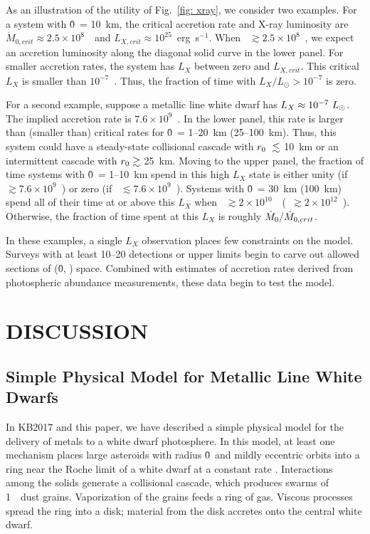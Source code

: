 \documentclass[12pt,preprint]{aastex}
\begin{document}
As an illustration of the utility of Fig.~\ref{fig: xray}, we consider two examples.
For a system with \r0\ = 10~km, the critical accretion rate and X-ray luminosity are 
$\dot{M}_{0, crit} \approx 2.5 \times 10^{8}$~\gs\ and 
$L_{X, crit} \approx 10^{25}$~erg~s$^{-1}$. When 
\mdotz\ $\gtrsim 2.5 \times 10^{8}$~\gs, we expect an accretion luminosity along the
diagonal solid curve in the lower panel. For smaller accretion rates, the system has
$L_X$ between zero and $L_{X, crit}$. This critical $L_X$ is smaller than $10^{-7}$~\lsun.
Thus, the fraction of time with $L_X / L_\odot > 10^{-7}$ is zero.

For a second example, suppose a metallic line white dwarf has $L_X \approx 10^{-7}~\lsun$.  
The implied accretion rate is $7.6 \times 10^9$~\gs.  In the lower panel, this rate is 
larger than (smaller than) critical rates for \r0\ = 1--20~km (25--100~km). Thus, this 
system could have a steady-state collisional cascade with $\r0\ \lesssim$ 10~km or an 
intermittent cascade with $\r0 \gtrsim$ 25~km. Moving to the upper panel, the fraction of
time systems with \r0\ = 1--10~km spend in this high $L_X$ state is either unity (if
\mdotz\ $\gtrsim 7.6 \times 10^9$~\gs) or zero (if \mdotz\ $\lesssim 7.6 \times 10^9$~\gs).
Systems with \r0\ = 30~km (100~km) spend all of their time at or above this $L_X$ when
\mdotz\ $\gtrsim 2 \times 10^{10}$~\gs\ (\mdotz\ $\gtrsim 2 \times 10^{12}$~\gs). 
Otherwise, the fraction of time spent at this $L_X$ is roughly $\mdotz / \dot{M}_{0, crit}$. 

In these examples, a single $L_X$ observation places few constraints on the model.  Surveys 
with at least 10--20 detections or upper limits begin to carve out allowed sections of
(\r0, \mdotz) space. Combined with estimates of accretion rates derived from photospheric
abundance measurements, these data begin to test the model.

\section{DISCUSSION}
\label{sec: disc}

\subsection{Simple Physical Model for Metallic Line White Dwarfs}
\label{sec: disc-mod}

In KB2017 and this paper, we have described a simple physical model for the delivery 
of metals to a white dwarf photosphere. In this model, at least one mechanism places
large asteroids with radius \r0\ and mildly eccentric orbits into a ring near the 
Roche limit of a white dwarf at a constant rate \mdotz.  Interactions among the solids 
generate a collisional cascade, which produces swarms of 1~\mum\ dust grains. 
Vaporization of the grains feeds a ring of gas.  Viscous processes spread the ring 
into a disk; material from the disk accretes onto the central white dwarf.
\end{document}
